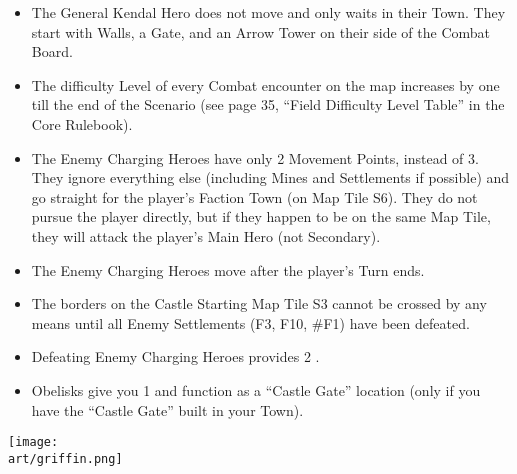 \begin{multicols*}{2}
\begin{itemize}
    \item The General Kendal Hero does not move and only waits in their Town. They start with Walls, a Gate,
      and an Arrow Tower on their side of the Combat Board.
    \item The difficulty Level of every Combat encounter on the map increases by one till the end of the Scenario
      (see page 35, ``Field Difficulty Level Table'' in the Core Rulebook).
    \item The Enemy Charging Heroes have only 2 Movement Points, instead of 3. They ignore everything else
      (including Mines and Settlements if possible) and go straight for the player's Faction Town (on Map Tile S6).
      They do not pursue the player directly, but if they happen to be on the same Map Tile, they will
      attack the player's Main Hero (not Secondary).
    \item The Enemy Charging Heroes move after the player's Turn ends.
    \item The borders on the Castle Starting Map Tile S3 cannot be crossed by any means until
      all Enemy Settlements (F3, F10, \#F1) have been defeated.
    \item Defeating Enemy Charging Heroes provides 2 .
    \item Obelisks give you 1  and function as a ``Castle
      Gate'' location (only if you have the ``Castle Gate'' built in your Town).
\end{itemize}

\vspace*{\fill}
\texttt{[image: \\art/griffin.png]}
\vspace*{\fill}

\end{multicols*}

